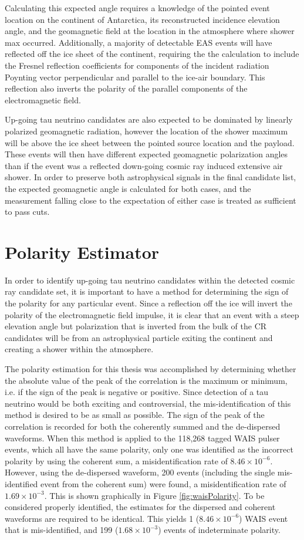 		Calculating this expected angle requires a knowledge of the pointed event location on the continent of Antarctica, its reconstructed incidence elevation angle, and the geomagnetic field at the location in the atmosphere where shower max occurred.  Additionally, a majority of detectable EAS events will have reflected off the ice sheet of the continent, requiring the the calculation to include the Fresnel reflection coefficients for components of the incident radiation Poynting vector perpendicular and parallel to the ice-air boundary.  This reflection also inverts the polarity of the parallel components of the electromagnetic field.
		
		Up-going tau neutrino candidates are also expected to be dominated by linearly polarized geomagnetic radiation, however the location of the shower maximum will be above the ice sheet between the pointed source location and the payload.  These events will then have different expected geomagnetic polarization angles than if the event was a reflected down-going cosmic ray induced extensive air shower.  In order to preserve both astrophysical signals in the final candidate list, the expected geomagnetic angle is calculated for both cases, and the measurement falling close to the expectation of either case is treated as sufficient to pass cuts.
		
		
\section{Polarity Estimator}%
	In order to identify up-going tau neutrino candidates within the detected cosmic ray candidate set, it is important to have a method for determining the sign of the polarity for any particular event.  Since a reflection off the ice will invert the polarity of the electromagnetic field impulse, it is clear that an event with a steep elevation angle but polarization that is inverted from the bulk of the CR candidates will be from an astrophysical particle exiting the continent and creating a shower within the atmosphere.
	
	The polarity estimation for this thesis was accomplished by determining whether the absolute value of the peak of the correlation is the maximum or minimum, i.e. if the sign of the peak is negative or positive.  Since detection of a tau neutrino would be both exciting and controversial, the mis-identification of this method is desired to be as small as possible.  The sign of the peak of the correlation is recorded for both the coherently summed and the de-dispersed waveforms.  When this method is applied to the 118,268 tagged WAIS pulser events, which all have the same polarity, only one was identified as the incorrect polarity by using the coherent sum, a misidentification rate of $8.46\times10^{-6}$.  However, using the de-dispersed waveform, 200 events (including the single mis-identified event from the coherent sum) were found, a misidentification rate of $1.69\times10^{-3}$.  This is shown graphically in Figure \ref{fig:waisPolarity}.  To be considered properly identified, the estimates for the dispersed and coherent waveforms are required to be identical.  This yields 1 ($8.46\times10^{-6}$) WAIS event that is mis-identified, and 199 ($1.68\times10^{-3}$) events of indeterminate polarity.
	
